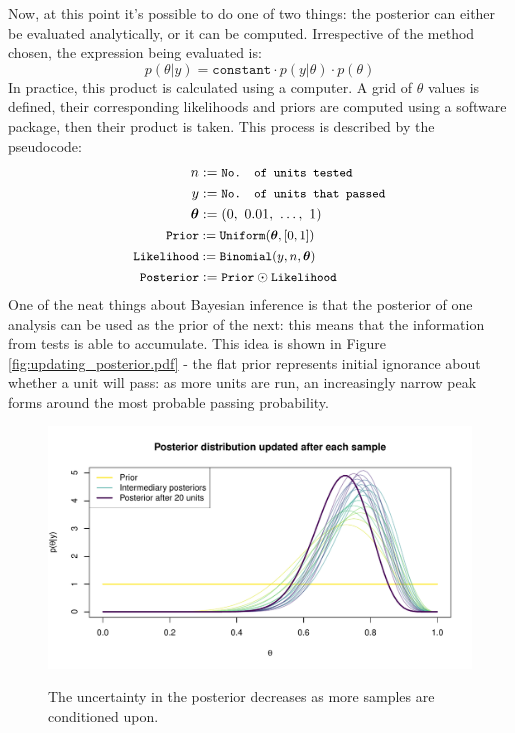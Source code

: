 \documentclass[11pt,a4paper,article]{memoir} %
\begin{document}
Now, at this point it's possible to do one of two things: the posterior can either be evaluated analytically, or it can be computed. Irrespective of the method chosen, the expression being evaluated is:
\begin{equation}
	p(\theta|y) = \texttt{constant}\cdot p(y|\theta) \cdot p(\theta)
\end{equation}
In practice, this product is calculated using a computer. A grid of $\theta$ values is defined, their corresponding likelihoods and priors are computed using a software package, then their product is taken. This process is described by the pseudocode:
\begin{align}
  \quad n &:= \small{\texttt{No. of units tested}} \\
   \quad y &:= \small{\texttt{No. of units that passed}} \\
  \boldsymbol{\theta} & := (0, \ 0.01, \ \dots, \ 1) \\
  \small{\texttt{Prior}} &:= \small{\texttt{Uniform}}(\boldsymbol{\theta}, [0, 1]) \\
  \small{\texttt{Likelihood}} &:= \small{\texttt{Binomial}}(y, n, \boldsymbol{\theta}) \\ 
  \small{\texttt{Posterior}} &:= \small{\texttt{Prior} \odot \texttt{Likelihood}}
\end{align}
One of the neat things about Bayesian inference is that the posterior of one analysis can be used as the prior of the next: this means that the information from tests is able to accumulate. This idea is shown in Figure \ref{fig:updating_posterior.pdf} - the flat prior represents initial ignorance about whether a unit will pass: as more units are run, an increasingly narrow peak forms around the most probable passing probability.

\begin{figure}
\includegraphics[width=\textwidth]{updating_posterior.pdf}
\label{fig:updating_posterior}
\caption{The uncertainty in the posterior decreases as more samples are conditioned upon.}
\end{figure}
\end{document}
